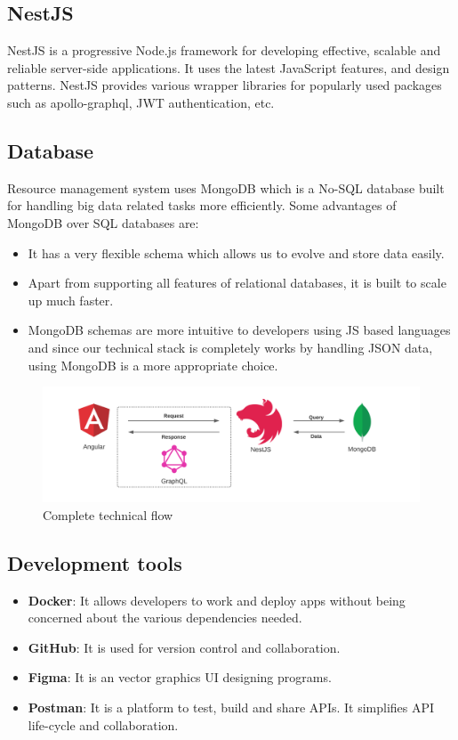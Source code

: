 \subsection{NestJS}
NestJS is a progressive Node.js framework for developing effective, scalable and reliable server-side applications. It uses the latest JavaScript features, and design patterns. NestJS provides various wrapper libraries for popularly used packages such as apollo-graphql, JWT authentication, etc. 

\subsection{Database}
Resource management system uses MongoDB which is a No-SQL database built for handling big data related tasks more efficiently. Some advantages of MongoDB over SQL databases are:
\begin{itemize}
    \item It has a very flexible schema which allows us to evolve and store data easily.
    \item Apart from supporting all features of relational databases, it is built to scale up much faster.
    \item MongoDB schemas are more intuitive to developers using JS based languages and since our technical stack is completely works by handling JSON data, using MongoDB is a more appropriate choice.
\end{itemize}

\begin{figure}[H]
    \centering
    \includegraphics[scale=0.15]{images/tech-stack.png}
    \caption{Complete technical flow}
    \label{fig:tech-stack}
\end{figure}

\subsection{Development tools}
\begin{itemize}
    \item \textbf{Docker}: It allows developers to work and deploy apps without being concerned about the various dependencies needed.
    \item \textbf{GitHub}: It is used for version control and collaboration.
    \item \textbf{Figma}: It is an vector graphics UI designing programs.
    \item \textbf{Postman}: It is a platform to test, build and share APIs. It simplifies API life-cycle and collaboration.
\end{itemize}

